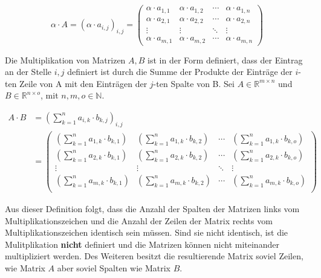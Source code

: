 \begin{equation*}
\alpha \cdot A = \left( \alpha \cdot a_{i,j} \right)_{i,j} = \begin{pmatrix}
\alpha \cdot a_{1,1} & \alpha \cdot a_{1,2} & \cdots & \alpha \cdot a_{1,n} \\
\alpha \cdot a_{2,1} & \alpha \cdot a_{2,2} & \cdots & \alpha \cdot a_{2,n} \\
\vdots & \vdots & \ddots & \vdots \\
\alpha \cdot a_{m,1} & \alpha \cdot a_{m,2} & \cdots & \alpha \cdot a_{m,n}
\end{pmatrix}
\end{equation*}

Die Multiplikation von Matrizen $A,B$ ist in der Form definiert, dass der Eintrag an der Stelle $i,j$ definiert ist durch die Summe der Produkte der Einträge der $i$-ten Zeile von A mit den Einträgen der $j$-ten Spalte von B. Sei $A\in \mathbb{R}^{m\times n}$ und $B\in \mathbb{R}^{n\times o}$, mit $n,m,o \in \mathbb{N}$.

\begin{equation*}
\begin{split}
A \cdot B & = \left( \sum_{k=1}^{n} a_{i,k} \cdot b_{k,j} \right)_{i,j} \\
 &= \begin{pmatrix}
\left( \sum_{k=1}^{n} a_{1,k} \cdot b_{k,1} \right) & \left( \sum_{k=1}^{n} a_{1,k} \cdot b_{k,2} \right) & \cdots & \left( \sum_{k=1}^{n} a_{1,k} \cdot b_{k,o} \right) \\
\left( \sum_{k=1}^{n} a_{2,k} \cdot b_{k,1} \right) & \left( \sum_{k=1}^{n} a_{2,k} \cdot b_{k,2} \right) & \cdots & \left( \sum_{k=1}^{n} a_{2,k} \cdot b_{k,o} \right) \\
\vdots & \vdots & \ddots & \vdots \\
\left( \sum_{k=1}^{n} a_{m,k} \cdot b_{k,1} \right) & \left( \sum_{k=1}^{n} a_{m,k} \cdot b_{k,2} \right) & \cdots & \left( \sum_{k=1}^{n} a_{m,k} \cdot b_{k,o} \right) \\
\end{pmatrix}
\end{split}
\end{equation*}

Aus dieser Definition folgt, dass die Anzahl der Spalten der Matrizen links vom Multiplikationszeichen und die Anzahl der Zeilen der Matrix rechts vom Multiplikationszeichen identisch sein müssen. Sind sie nicht identisch, ist die Mulitplikation \textbf{nicht} definiert und die Matrizen können nicht miteinander multipliziert werden. Des Weiteren besitzt die resultierende Matrix soviel Zeilen, wie Matrix $A$ aber soviel Spalten wie Matrix $B$.

